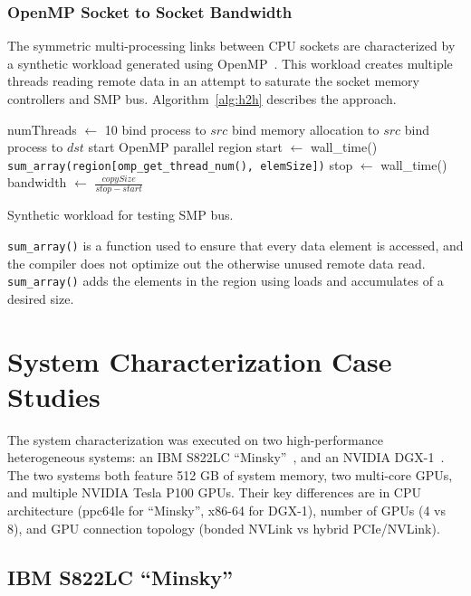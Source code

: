 \subsubsection{OpenMP Socket to Socket Bandwidth}

The symmetric multi-processing links between CPU sockets are characterized by a synthetic workload generated using OpenMP~\cite{openmp2013}.
This workload creates multiple threads reading remote data in an attempt to saturate the socket memory controllers and SMP bus.
Algorithm~\ref{alg:h2h} describes the approach.

\begin{algorithm}[ht]
    \SetAlgoLined
    numThreads $\gets$ 10\;
    \;
     {
        bind process to $src$\;
        bind memory allocation to $src$\;
        bind process to $dst$\;
        start OpenMP parallel region\;
        start $\gets$ wall\_time()\;
        \texttt{sum\_array(region[omp\_get\_thread\_num(), elemSize])}\;
        stop $\gets$ wall\_time()\;
        bandwidth $\gets$ $\frac{copySize}{stop - start}$\;
    }
    \caption{Synthetic workload for testing SMP bus.}
    \label{alg:h2h}
\end{algorithm}

\texttt{sum\_array()} is a function used to ensure that every data element is accessed, and the compiler does not optimize out the otherwise unused remote data read.
\texttt{sum\_array()} adds the elements in the region using loads and accumulates of a desired size.

%
%
\section{System Characterization Case Studies}

The system characterization was executed on two high-performance heterogeneous systems: an IBM S822LC ``Minsky''~\cite{ibm2015minsky}, and an NVIDIA DGX-1~\cite{nvidia2016dgx1}.
The two systems both feature 512 GB of system memory, two multi-core GPUs, and multiple NVIDIA Tesla P100 GPUs.
Their key differences are in CPU architecture (ppc64le for ``Minsky'', x86-64 for DGX-1), number of GPUs (4 vs 8), and GPU connection topology (bonded NVLink vs hybrid PCIe/NVLink).

\subsection{IBM S822LC ``Minsky''}
\label{sec:topology-minsky}

